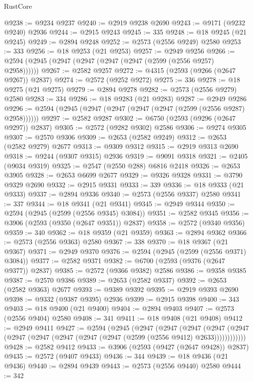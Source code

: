 \begin{lexlean}{RustCore}
\begin{coremodule}
@9238 := @9234 @9237
@9240 := @2919 @9238 @2690
@9243 := @9171 (@9232 @9240) @2936
@9244 := @2915 @9243
@9245 := 335
@9248 := @18 @9245 (@21 @9245)
@9249 := @2894 @9248
@9252 := @2573 (@2556 @9249) @2580
@9253 := 333
@9256 := @18 @9253 (@21 @9253)
@9257 := @2949 @9256
@9266 := @2594 (@2945 (@2947 (@2947 (@2947 (@2947 (@2599 (@2556 @9257) @2958))))))
@9267 := @2582 @9257
@9272 := @4315 (@2593 (@9266 (@2647 @9267)) @2837)
@9274 := @2572 (@9252 @9272)
@9275 := 336
@9278 := @18 @9275 (@21 @9275)
@9279 := @2894 @9278
@9282 := @2573 (@2556 @9279) @2580
@9283 := 334
@9286 := @18 @9283 (@21 @9283)
@9287 := @2949 @9286
@9296 := @2594 (@2945 (@2947 (@2947 (@2947 (@2947 (@2599 (@2556 @9287) @2958))))))
@9297 := @2582 @9287
@9302 := @6750 (@2593 (@9296 (@2647 @9297)) @2837)
@9305 := @2572 (@9282 @9302) @2586
@9306 := @9274 @9305
@9307 := @2570 @9306
@9309 := @2653 (@2582 @9249)
@9312 := @2653 (@2582 @9279) @2677
@9313 := @9309 @9312
@9315 := @2919 @9313 @2690
@9318 := @9244 (@9307 @9315) @2936
@9319 := @9091 @9318
@9321 := @2405 (@9034 @9319)
@9325 := @2547 (@2550 @288) @6816 @2418
@9326 := @2653 @3905
@9328 := @2653 @6699 @2677
@9329 := @9326 @9328
@9331 := @3790 @9329 @2690
@9332 := @2915 @9331
@9333 := 339
@9336 := @18 @9333 (@21 @9333)
@9337 := @2894 @9336
@9340 := @2573 (@2556 @9337) @2580
@9341 := 337
@9344 := @18 @9341 (@21 @9341)
@9345 := @2949 @9344
@9350 := @2594 (@2945 (@2599 (@2556 @9345) @3084))
@9351 := @2582 @9345
@9356 := @3906 (@2593 (@9350 (@2647 @9351)) @2837)
@9358 := @2572 (@9340 @9356)
@9359 := 340
@9362 := @18 @9359 (@21 @9359)
@9363 := @2894 @9362
@9366 := @2573 (@2556 @9363) @2580
@9367 := 338
@9370 := @18 @9367 (@21 @9367)
@9371 := @2949 @9370
@9376 := @2594 (@2945 (@2599 (@2556 @9371) @3084))
@9377 := @2582 @9371
@9382 := @6700 (@2593 (@9376 (@2647 @9377)) @2837)
@9385 := @2572 (@9366 @9382) @2586
@9386 := @9358 @9385
@9387 := @2570 @9386
@9389 := @2653 (@2582 @9337)
@9392 := @2653 (@2582 @9363) @2677
@9393 := @9389 @9392
@9395 := @2919 @9393 @2690
@9398 := @9332 (@9387 @9395) @2936
@9399 := @2915 @9398
@9400 := 343
@9403 := @18 @9400 (@21 @9400)
@9404 := @2894 @9403
@9407 := @2573 (@2556 @9404) @2580
@9408 := 341
@9411 := @18 @9408 (@21 @9408)
@9412 := @2949 @9411
@9427 := @2594
    (@2945
      (@2947
        (@2947
          (@2947
            (@2947 (@2947 (@2947 (@2947 (@2947 (@2947 (@2947 (@2599 (@2556 @9412) @2633))))))))))))
@9428 := @2582 @9412
@9433 := @3906 (@2593 (@9427 (@2647 @9428)) @2837)
@9435 := @2572 (@9407 @9433)
@9436 := 344
@9439 := @18 @9436 (@21 @9436)
@9440 := @2894 @9439
@9443 := @2573 (@2556 @9440) @2580
@9444 := 342

\end{coremodule}
\end{lexlean}
